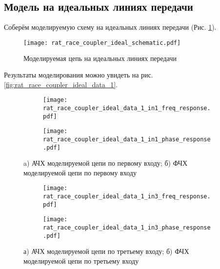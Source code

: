 \subsection{Модель на идеальных линиях передачи}

Соберём моделируемую схему на идеальных линиях передачи (Рис. \ref{fig:rat_race_coupler_ideal_schematic}).

\begin{figure}[!ht]
    \centering
    \texttt{[image: rat\_race\_coupler\_ideal\_schematic.pdf]}
    \caption{Моделируемая цепь на идеальных линиях передачи}
    \label{fig:rat_race_coupler_ideal_schematic}
\end{figure}

Результаты моделирования можно увидеть на рис. \ref{fig:rat_race_coupler_ideal_data_1}.

\begin{figure}[!ht]
    \centering
    \begin{subfigure}[b]{0.40\textwidth}
        \centering
        \texttt{[image: rat\_race\_coupler\_ideal\_data\_1\_in1\_freq\_response.pdf]}
        \caption{}
        \label{fig:rat_race_coupler_ideal_data_1_in1_freq_response}
    \end{subfigure}
    \hfill
    \begin{subfigure}[b]{0.40\textwidth}
        \centering
        \texttt{[image: rat\_race\_coupler\_ideal\_data\_1\_in1\_phase\_response.pdf]}
        \caption{}
        \label{fig:rat_race_coupler_ideal_data_1_in1_phase_response}
    \end{subfigure}
    \caption{
        a) АЧХ моделируемой цепи по первому входу;
        б) ФЧХ моделируемой цепи по первому входу
    }
    \label{fig:rat_race_coupler_ideal_data_1_in1}
\end{figure}

\begin{figure}[!ht]
    \begin{subfigure}[b]{0.40\textwidth}
        \centering
        \texttt{[image: rat\_race\_coupler\_ideal\_data\_1\_in3\_freq\_response.pdf]}
        \caption{}
        \label{fig:rat_race_coupler_ideal_data_1_in3_freq_response}
    \end{subfigure}
    \hfill
    \begin{subfigure}[b]{0.40\textwidth}
        \centering
        \texttt{[image: rat\_race\_coupler\_ideal\_data\_1\_in3\_phase\_response.pdf]}
        \caption{}
        \label{fig:rat_race_coupler_ideal_data_1_in3_phase_response}
    \end{subfigure}
    \caption{
        а) АЧХ моделируемой цепи по третьему входу;
        б) ФЧХ моделируемой цепи по третьему входу
    }
    \label{fig:rat_race_coupler_ideal_data_1_in3}
\end{figure}

